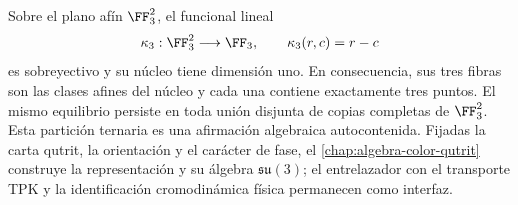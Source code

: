 Sobre el plano afín \(\FF_3^2\), el funcional lineal
\[
 \kappa_3:\FF_3^2\longrightarrow\FF_3,
 \qquad \kappa_3(r,c)=r-c
\]
es sobreyectivo y su núcleo tiene dimensión uno. En consecuencia, sus tres
fibras son las clases afines del núcleo y cada una contiene exactamente tres
puntos. El mismo equilibrio persiste en toda unión disjunta de copias
completas de \(\FF_3^2\). Esta partición ternaria es una afirmación algebraica
autocontenida. Fijadas la carta qutrit, la orientación y el carácter de fase,
el \cref{chap:algebra-color-qutrit} construye la representación y su álgebra
\(\mathfrak{su}(3)\); el entrelazador con el transporte TPK y la identificación
cromodinámica física permanecen como interfaz.

